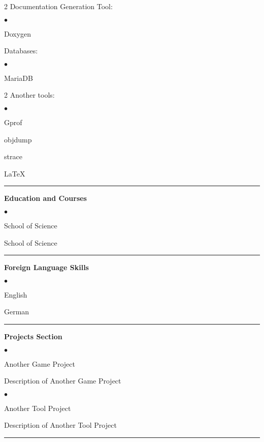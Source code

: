 \documentclass[oneside,final,12pt]{extreport}
\newenvironment{compactlist}{
	\begin{list}{{$\bullet$}}{
		\setlength\leftmargin{0.4cm}
		\setlength\partopsep{0pt}
		\setlength\parskip{0pt}
		\setlength\parsep{0pt}
		\setlength\topsep{0pt}
		\setlength\itemsep{0pt}
	}
}{
	\end{list}
}
\begin{document}
\begin{multicols}{2}
	Documentation Generation Tool:
	\begin{compactlist}
		\item Doxygen
	\end{compactlist}
	Databases:
	\begin{compactlist}
		 \item MariaDB
	\end{compactlist}
\end{multicols}

\begin{multicols}{2}
	Another tools:
	\begin{compactlist}
		\item Gprof
		\item objdump
		\item strace
		\item LaTeX
	\end{compactlist}
\end{multicols}
\rule{\textwidth}{0.4pt}

\bfseries
Education and Courses
\mdseries
\begin{compactlist}
	\item School of Science
	\item School of Science
\end{compactlist}
\rule{\textwidth}{0.4pt}

\bfseries
Foreign Language Skills
\mdseries
\begin{compactlist}
	\item English
	\item German
\end{compactlist}
\rule{\textwidth}{0.4pt}

\bfseries
Projects Section
\mdseries
\begin{compactlist}
	\item Another Game Project
\end{compactlist}
Description of Another Game Project
\begin{compactlist}
	\item Another Tool Project
\end{compactlist}
Description of Another Tool Project \\
\rule{\textwidth}{0.4pt}
\end{document}
